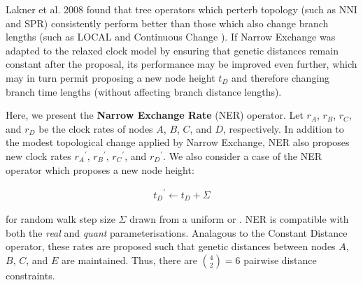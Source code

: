 \documentclass[10pt,letterpaper]{article}
\begin{document}
Lakner et al. 2008 \cite{lakner2008efficiency} found that tree operators which perterb topology (such as NNI and SPR) consistently perform better than those which also change branch lengths (such as LOCAL \cite{simon1998local} and Continuous Change \cite{jow2002bayesian}). If Narrow Exchange was adapted to the relaxed clock model by ensuring that genetic distances remain constant after the proposal, its performance may be improved even further, which may in turn permit proposing a new node height $t_D$ and therefore changing branch time lengths (without affecting branch distance lengths).



Here, we present the \textbf{Narrow Exchange Rate} (NER) operator. Let $r_A$, $r_B$, $r_C$, and $r_D$ be the clock rates of nodes $A$, $B$, $C$, and $D$, respectively. In addition to the modest topological change applied by Narrow Exchange, NER also proposes new clock rates ${r_A}^\prime$, ${r_B}^\prime$, ${r_C}^\prime$, and ${r_D}^\prime$. We also consider a case of the NER operator which proposes a new node height:

\begin{align}
	{t_D}^\prime \leftarrow t_D + \Sigma
\end{align}

for random walk step size $\Sigma$ drawn from a uniform or \textbf{}. NER is compatible with both the \textit{real} and \textit{quant} parameterisations. Analagous to the Constant Distance operator, these rates are proposed such that genetic distances between nodes $A$, $B$, $C$, and $E$ are maintained. Thus, there are $\binom{4}{2} = 6$ pairwise distance constraints.
\end{document}
